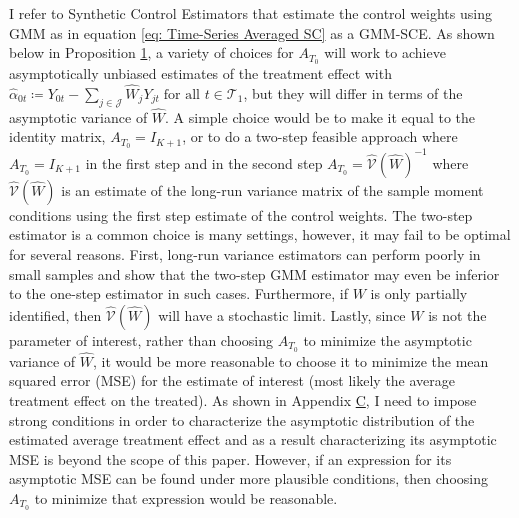 \documentclass{article}
\begin{document}
\par
I refer to Synthetic Control Estimators that estimate the control weights using GMM as in equation \eqref{eq: Time-Series Averaged SC} as a GMM-SCE. As shown below in Proposition \hyperref[P1]{1}, a variety of choices for $A_{T_0}$ will work to achieve asymptotically unbiased estimates of the treatment effect with $\hat{\alpha}_{0t} \coloneqq Y_{0t} - \sum_{j \in \mathcal{J}} \hat{W}_j Y_{jt} \; \text{for all } t \in \mathcal{T}_1$, but they will differ in terms of the asymptotic variance of $\hat{W}$. A simple choice would be to make it equal to the identity matrix, $A_{T_0} = I_{K+1}$, or to do a two-step feasible approach where $A_{T_0} = I_{K+1}$ in the first step and in the second step $A_{T_0} = \hat{\mathcal{V}}(\hat{W})^{-1}$ where $\hat{\mathcal{V}}(\hat{W})$ is an estimate of the long-run variance matrix of the sample moment conditions using the first step estimate of the control weights. The two-step estimator is a common choice is many settings, however, it may fail to be optimal for several reasons. First, long-run variance estimators can perform poorly in small samples and \cite{HWANG2018} show that the two-step GMM estimator may even be inferior to the one-step estimator in such cases. Furthermore, if $W$ is only partially identified, then $\hat{\mathcal{V}}(\hat{W})$ will have a stochastic limit. Lastly, since $W$ is not the parameter of interest, rather than choosing $A_{T_0}$ to minimize the asymptotic variance of $\hat{W}$, it would be more reasonable to choose it to minimize the mean squared error (MSE) for the estimate of interest (most likely the average treatment effect on the treated). As shown in Appendix \hyperref[ApC]{C}, I need to impose strong conditions in order to characterize the asymptotic distribution of the estimated average treatment effect and as a result characterizing its asymptotic MSE is beyond the scope of this paper. However, if an expression for its asymptotic MSE can be found under more plausible conditions, then choosing $A_{T_0}$ to minimize that expression would be reasonable.
\par 
\end{document}
